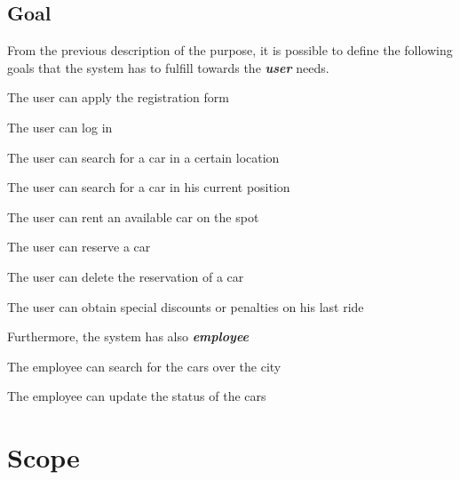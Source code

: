 \documentclass[11pt,a4paper]{report}
\begin{document}
\subsection{Goal}
From the previous description of the purpose, it is possible to define the following goals that the system has to fulfill towards the \textit{\textbf{user}} needs.
\begin{Goal}
\item The user can apply the registration form
\item The user can log in
\item The user can search for a car in a certain location
\item The user can search for a car in his current position
\item The user can rent an available car on the spot
\item The user can reserve a car
\item The user can delete the reservation of a car
\item The user can obtain special discounts or penalties on his last ride
\end{Goal}
Furthermore, the system has also  \textbf{\textit{employee}}
\begin{Goal}[resume]
\item The employee can search for the cars over the city
\item The employee can update the status of the cars
\end{Goal}

\section{Scope}
\end{document}
